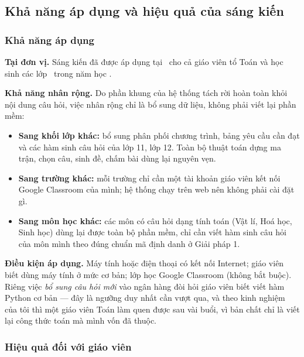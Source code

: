 \subsection{Khả năng áp dụng và hiệu quả của sáng kiến}

\subsubsection{Khả năng áp dụng}

\textbf{Tại đơn vị.} Sáng kiến đã được áp dụng tại \DONVI\ cho cả giáo viên tổ
Toán và học sinh các lớp \dotfill\ trong năm học \NAMHOC.

\textbf{Khả năng nhân rộng.} Do phần khung của hệ thống tách rời hoàn toàn khỏi
nội dung câu hỏi, việc nhân rộng chỉ là bổ sung dữ liệu, không phải viết lại
phần mềm:

\begin{itemize}[leftmargin=1.2cm, itemsep=3pt]
  \item \textbf{Sang khối lớp khác:} bổ sung phân phối chương trình, bảng yêu
        cầu cần đạt và các hàm sinh câu hỏi của lớp 11, lớp 12. Toàn bộ thuật
        toán dựng ma trận, chọn câu, sinh đề, chấm bài dùng lại nguyên vẹn.
  \item \textbf{Sang trường khác:} mỗi trường chỉ cần một tài khoản giáo viên
        kết nối Google Classroom của mình; hệ thống chạy trên web nên không
        phải cài đặt gì.
  \item \textbf{Sang môn học khác:} các môn có câu hỏi dạng tính toán (Vật lí,
        Hoá học, Sinh học) dùng lại được toàn bộ phần mềm, chỉ cần viết hàm
        sinh câu hỏi của môn mình theo đúng chuẩn mã định danh ở Giải pháp 1.
\end{itemize}

\textbf{Điều kiện áp dụng.} Máy tính hoặc điện thoại có kết nối Internet; giáo
viên biết dùng máy tính ở mức cơ bản; lớp học Google Classroom (không bắt
buộc). Riêng việc \textit{bổ sung câu hỏi mới} vào ngân hàng đòi hỏi giáo viên
biết viết hàm Python cơ bản --- đây là ngưỡng duy nhất cần vượt qua, và theo
kinh nghiệm của tôi thì một giáo viên Toán làm quen được sau vài buổi, vì bản
chất chỉ là viết lại công thức toán mà mình vốn đã thuộc.

\subsubsection{Hiệu quả đối với giáo viên}

